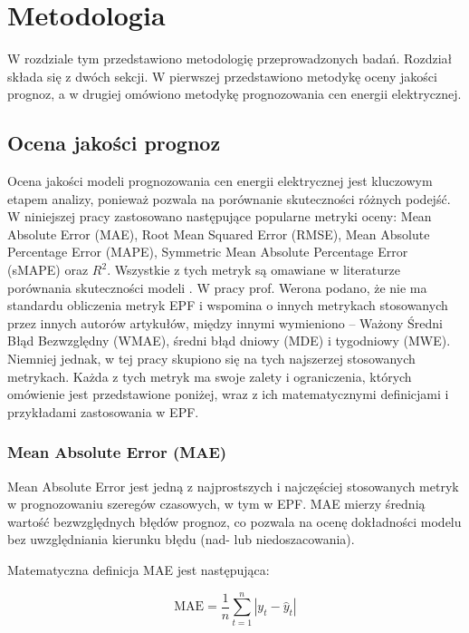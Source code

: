 \chapter{Metodologia}
\label{ch:metodologia}

W rozdziale tym przedstawiono metodologię przeprowadzonych badań. Rozdział składa się z dwóch sekcji. W pierwszej przedstawiono metodykę oceny jakości prognoz, a w drugiej omówiono metodykę prognozowania cen energii elektrycznej.

\section{Ocena jakości prognoz}
\label{sec:ocena_jakosci_prognoz}

Ocena jakości modeli prognozowania cen energii elektrycznej jest kluczowym etapem analizy, ponieważ pozwala na porównanie skuteczności różnych podejść. W niniejszej pracy zastosowano następujące popularne metryki oceny: Mean Absolute Error (MAE), Root Mean Squared Error (RMSE), Mean Absolute Percentage Error (MAPE), Symmetric Mean Absolute Percentage Error (sMAPE) oraz \( R^2 \). Wszystkie z tych metryk są omawiane w literaturze porównania skuteczności modeli \cite{en17225797}. W pracy prof. Werona \cite{WERON20141030} podano, że nie ma standardu obliczenia metryk EPF i wspomina o innych metrykach stosowanych przez innych autorów artykułów, między innymi wymieniono -- Ważony Średni Błąd Bezwzględny (WMAE), średni błąd dniowy (MDE) i tygodniowy (MWE). Niemniej jednak, w tej pracy skupiono się na tych najszerzej stosowanych metrykach. Każda z tych metryk ma swoje zalety i ograniczenia, których omówienie jest przedstawione poniżej, wraz z ich matematycznymi definicjami i przykładami zastosowania w EPF.

\subsection{Mean Absolute Error (MAE)}
\label{subsec:mae}

Mean Absolute Error jest jedną z najprostszych i najczęściej stosowanych metryk w prognozowaniu szeregów czasowych, w tym w EPF. MAE mierzy średnią wartość bezwzględnych błędów prognoz, co pozwala na ocenę dokładności modelu bez uwzględniania kierunku błędu (nad- lub niedoszacowania).

Matematyczna definicja MAE jest następująca:

\[
\text{MAE} = \frac{1}{n} \sum_{t=1}^{n} \left| y_t - \hat{y}_t \right|
\]

